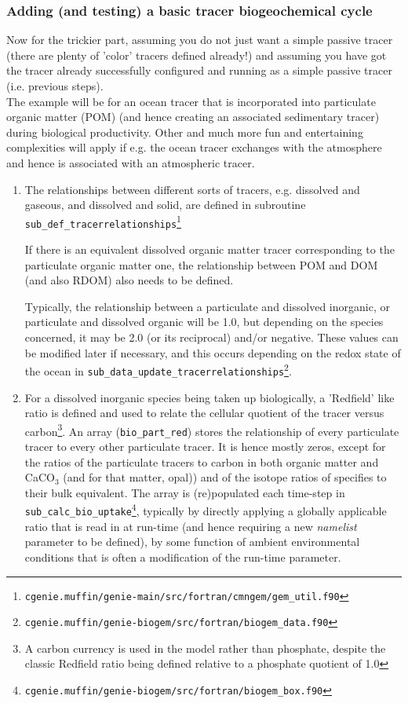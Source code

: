 \documentclass[10pt,twoside]{article}
\begin{document}
\subsubsection{Adding (and testing) a basic tracer biogeochemical cycle}

Now for the trickier part, assuming you do not just want a simple passive tracer (there are plenty of 'color' tracers defined already!) and assuming you have got the tracer already successfully configured and running as a simple passive tracer (i.e. previous steps).
\\The example will be for an ocean tracer that is incorporated into particulate organic matter (POM) (and hence creating an associated sedimentary tracer) during biological productivity.
Other and much more fun and entertaining complexities will apply if e.g. the ocean tracer exchanges with the atmosphere and hence is associated with an atmospheric tracer.
\begin{enumerate}
\item 
The relationships between different sorts of tracers, e.g. dissolved and gaseous, and dissolved and solid, are defined in subroutine \texttt{sub\_def\_tracerrelationships}\footnote{\texttt{cgenie.muffin/genie-main/src/fortran/cmngem/gem\_util.f90}}

If there is an equivalent dissolved organic matter tracer corresponding to the particulate organic matter one, the relationship between POM and DOM (and also RDOM) also needs to be defined.

Typically, the relationship between a particulate and dissolved inorganic, or particulate and dissolved organic will be 1.0, but depending on the species concerned, it may be 2.0 (or its reciprocal) and/or negative. These values can be modified later if necessary, and this occurs depending on the redox state of the ocean in \texttt{sub\_data\_update\_tracerrelationships}\footnote{\texttt{cgenie.muffin/genie-biogem/src/fortran/biogem\_data.f90}}.

\item 
For a dissolved inorganic species being taken up biologically, a 'Redfield' like ratio is defined and used to relate the cellular quotient of the tracer versus carbon\footnote{A carbon currency is used in the model rather than phosphate, despite the classic Redfield ratio being defined relative to a phosphate quotient of 1.0}. An array (\texttt{bio\_part\_red}) stores the relationship of every particulate tracer to every other particulate tracer. It is hence mostly zeros, except for the ratios of the particulate tracers to carbon in both organic matter and CaCO\(_{3}\) (and for that matter, opal)) and of the isotope ratios of specifies to their bulk equivalent. The array is (re)populated each time-step in \texttt{sub\_calc\_bio\_uptake}\footnote{\texttt{cgenie.muffin/genie-biogem/src/fortran/biogem\_box.f90}},  typically by directly applying a  globally applicable ratio that is read in at run-time (and hence requiring a new \textit{namelist} parameter to be defined), by some function of ambient environmental conditions that  is often a modification of the run-time parameter.    

\end{enumerate}
\end{document}
